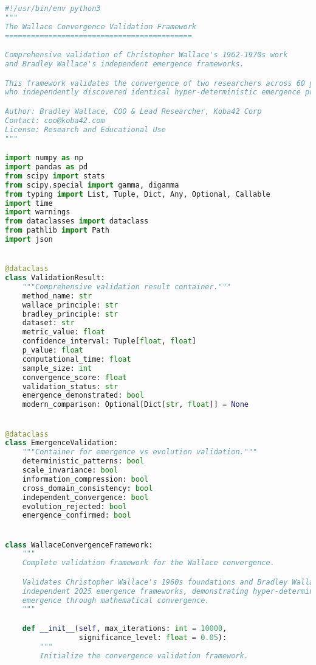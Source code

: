 \begin{lstlisting}[language=Python, caption=Complete Wallace Validation Framework Implementation]
#!/usr/bin/env python3
"""
The Wallace Convergence Validation Framework
===========================================

Comprehensive validation of Christopher Wallace's 1962-1970s work
and Bradley Wallace's independent emergence frameworks.

This framework validates the convergence of two researchers across 60 years
who independently discovered identical hyper-deterministic emergence principles.

Author: Bradley Wallace, COO & Lead Researcher, Koba42 Corp
Contact: coo@koba42.com
License: Research and Educational Use
"""

import numpy as np
import pandas as pd
from scipy import stats
from scipy.special import gamma, digamma
from typing import List, Tuple, Dict, Any, Optional, Callable
import time
import warnings
from dataclasses import dataclass
from pathlib import Path
import json


@dataclass
class ValidationResult:
    """Comprehensive validation result container."""
    method_name: str
    wallace_principle: str
    bradley_principle: str
    dataset: str
    metric_value: float
    confidence_interval: Tuple[float, float]
    p_value: float
    computational_time: float
    sample_size: int
    convergence_score: float
    validation_status: str
    emergence_demonstrated: bool
    modern_comparison: Optional[Dict[str, float]] = None


@dataclass
class EmergenceValidation:
    """Container for emergence vs evolution validation."""
    deterministic_patterns: bool
    scale_invariance: bool
    information_compression: bool
    cross_domain_consistency: bool
    independent_convergence: bool
    evolution_rejected: bool
    emergence_confirmed: bool


class WallaceConvergenceFramework:
    """
    Complete validation framework for the Wallace convergence.

    Validates Christopher Wallace's 1960s foundations and Bradley Wallace's
    independent 2025 emergence frameworks, demonstrating hyper-deterministic
    emergence through mathematical convergence.
    """

    def __init__(self, max_iterations: int = 10000,
                 significance_level: float = 0.05):
        """
        Initialize the convergence validation framework.


\end{lstlisting}
